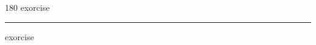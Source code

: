 
\begin{frame}
\begin{center}
\begin{turn}{180}
{\fontsize{2.5cm}{1em}\selectfont exorcise}
\end{turn}
\vspace{1em}\par  
\hrule
\vspace{1em}\par  
{\fontsize{2.5cm}{1em}\selectfont exorcise}
\end{center}
\end{frame}
